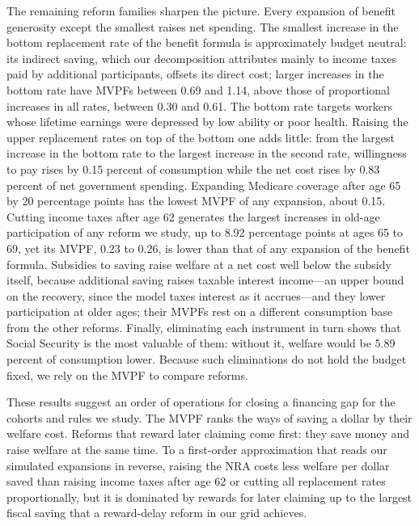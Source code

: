 The remaining reform families sharpen the picture. Every expansion of benefit generosity except the smallest raises net spending. The smallest increase in the bottom replacement rate of the benefit formula is approximately budget neutral: its indirect saving, which our decomposition attributes mainly to income taxes paid by additional participants, offsets its direct cost; larger increases in the bottom rate have MVPFs between 0.69 and 1.14, above those of proportional increases in all rates, between 0.30 and 0.61. The bottom rate targets workers whose lifetime earnings were depressed by low ability or poor health. Raising the upper replacement rates on top of the bottom one adds little: from the largest increase in the bottom rate to the largest increase in the second rate, willingness to pay rises by 0.15 percent of consumption while the net cost rises by 0.83 percent of net government spending. Expanding Medicare coverage after age 65 by 20 percentage points has the lowest MVPF of any expansion, about 0.15. Cutting income taxes after age 62 generates the largest increases in old-age participation of any reform we study, up to 8.92 percentage points at ages 65 to 69, yet its MVPF, 0.23 to 0.26, is lower than that of any expansion of the benefit formula. Subsidies to saving raise welfare at a net cost well below the subsidy itself, because additional saving raises taxable interest income---an upper bound on the recovery, since the model taxes interest as it accrues---and they lower participation at older ages; their MVPFs rest on a different consumption base from the other reforms. Finally, eliminating each instrument in turn shows that Social Security is the most valuable of them: without it, welfare would be 5.89 percent of consumption lower. Because such eliminations do not hold the budget fixed, we rely on the MVPF to compare reforms.

These results suggest an order of operations for closing a financing gap for the cohorts and rules we study. The MVPF ranks the ways of saving a dollar by their welfare cost. Reforms that reward later claiming come first: they save money and raise welfare at the same time. To a first-order approximation that reads our simulated expansions in reverse, raising the NRA costs less welfare per dollar saved than raising income taxes after age 62 or cutting all replacement rates proportionally, but it is dominated by rewards for later claiming up to the largest fiscal saving that a reward-delay reform in our grid achieves.

